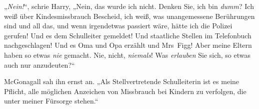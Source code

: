 „\emph{Nein!}“, schrie Harry, „Nein, das wurde ich nicht. Denken Sie, ich bin \emph{dumm}? Ich weiß über Kindesmissbrauch Bescheid, ich weiß, was unangemessene Berührungen sind und all das, und wenn irgendetwas passiert wäre, hätte ich die Polizei gerufen! Und es dem Schulleiter gemeldet! Und staatliche Stellen im Telefonbuch nachgeschlagen! Und es Oma und Opa erzählt und Mrs~Figg! Aber meine Eltern haben so etwas \emph{nie} gemacht. Nie, nicht, \emph{niemals}! Was \emph{erlauben} Sie sich, so etwas auch nur anzudeuten?“

McGonagall sah ihn ernst an. „Als Stellvertretende Schulleiterin ist es meine Pflicht, alle möglichen Anzeichen von Missbrauch bei Kindern zu verfolgen, die unter meiner Fürsorge stehen.“

